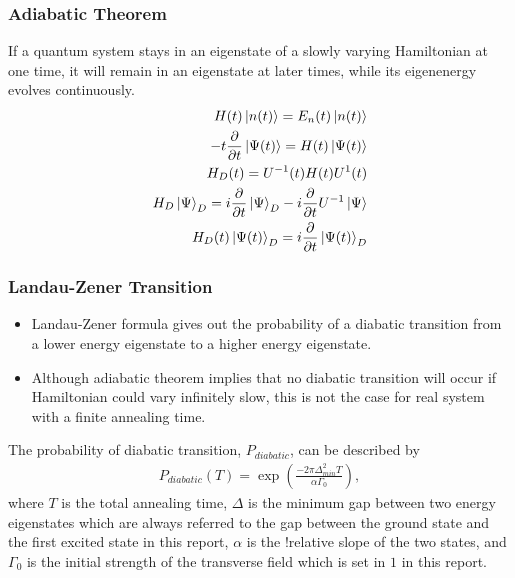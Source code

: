 \documentclass{beamer}
\begin{document}
\begin{frame}
	\frametitle{Adiabatic Theorem}
	If a quantum system stays in an eigenstate of a slowly varying Hamiltonian at one time, it will remain in an eigenstate at later times, while its eigenenergy evolves continuously.\\
	\begin{equation*}
	\begin{split}
	H(t)\ket{n(t)}=E_n(t)\ket{n(t)}\\
	-t\frac{\partial}{\partial t}\ket{\Psi (t)} = H(t)\ket{\Psi(t)} \\
	H_D(t)=U^{-1}(t)H(t)U^{1}(t)\\
	H_D\ket{\Psi}_D = i \frac{\partial}{\partial t}\ket{\Psi}_D - i \frac{\partial}{\partial t} U^{-1} \ket{\Psi}\\
	H_D(t)\ket{\Psi(t)}_D = i \frac{\partial}{\partial t} \ket{\Psi(t)}_D
	\end{split}
	\end{equation*}
\end{frame}

\begin{frame}
	\frametitle{Landau-Zener Transition}
	\begin{itemize}
		\item Landau-Zener formula gives out the probability of a diabatic transition from a lower energy eigenstate to a higher energy eigenstate.
		\item Although adiabatic theorem implies that no diabatic transition will occur if Hamiltonian could vary infinitely slow, this is not
		the case for real system with a finite annealing time.
	\end{itemize}
	The probability of diabatic transition, $P_{diabatic}$, can be described by \\
	\begin{equation*}
	\begin{split}
	P_{diabatic}(T) = \exp({\frac{-2\pi\Delta_{min}^2 T}{\alpha\Gamma_0}}),
	\end{split}
	\end{equation*}
	where $T$ is the total annealing time, $\Delta$ is the minimum gap between two energy eigenstates which are always referred to the gap between the ground state and the first excited state in this report, $\alpha$ is the !relative slope of the two states, and $\Gamma_0$ is the initial strength of the transverse field which is set in $1$ in this report.
\end{frame}
\end{document}
